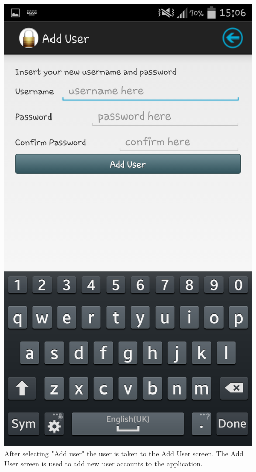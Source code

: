\begin{center}
 \includegraphics[width=13cm]{screenshots/normal/2_AddUser.png}
\textbf{\\}
After selecting "Add user" the user is taken to the Add User screen. The Add User screen is used to add new user accounts to the application.
\end{center}
